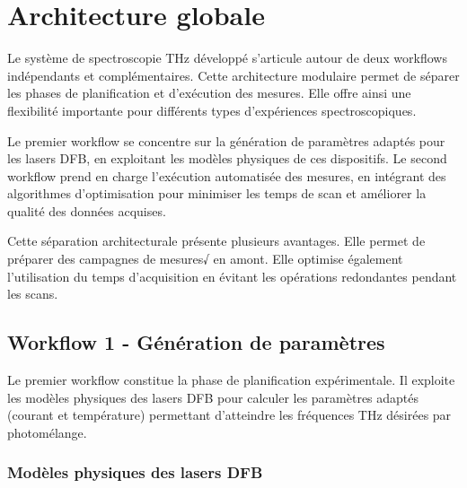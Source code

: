 





\section{Architecture globale}

Le système de spectroscopie THz développé s'articule autour de deux workflows indépendants et complémentaires. Cette architecture modulaire permet de séparer les phases de planification et d'exécution des mesures. Elle offre ainsi une flexibilité importante pour différents types d'expériences spectroscopiques.

Le premier workflow se concentre sur la génération de paramètres adaptés pour les lasers DFB, en exploitant les modèles physiques de ces dispositifs. Le second workflow prend en charge l'exécution automatisée des mesures, en intégrant des algorithmes d'optimisation pour minimiser les temps de scan et améliorer la qualité des données acquises.

Cette séparation architecturale présente plusieurs avantages. Elle permet de préparer des campagnes de mesures√ en amont. Elle optimise également l'utilisation du temps d'acquisition en évitant les opérations redondantes pendant les scans.

\subsection{Workflow 1 - Génération de paramètres}

Le premier workflow constitue la phase de planification expérimentale. Il exploite les modèles physiques des lasers DFB pour calculer les paramètres adaptés (courant et température) permettant d'atteindre les fréquences THz désirées par photomélange.

\subsubsection{Modèles physiques des lasers DFB}

